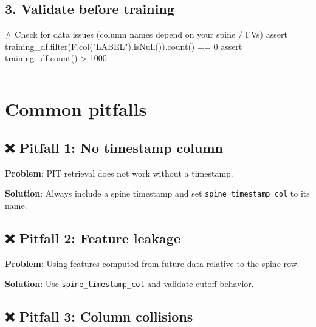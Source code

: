 \documentclass[
  letterpaper,
  DIV=11,
  numbers=noendperiod]{scrreprt}
\newenvironment{Shaded}{\begin{snugshade}}{\end{snugshade}}
\newcommand{\BuiltInTok}[1]{\textcolor[rgb]{0.00,0.23,0.31}{#1}}
\newcommand{\CommentTok}[1]{\textcolor[rgb]{0.37,0.37,0.37}{#1}}
\newcommand{\ControlFlowTok}[1]{\textcolor[rgb]{0.00,0.23,0.31}{#1}}
\newcommand{\DecValTok}[1]{\textcolor[rgb]{0.68,0.00,0.00}{#1}}
\newcommand{\NormalTok}[1]{\textcolor[rgb]{0.00,0.23,0.31}{#1}}
\newcommand{\OperatorTok}[1]{\textcolor[rgb]{0.37,0.37,0.37}{#1}}
\newcommand{\StringTok}[1]{\textcolor[rgb]{0.13,0.47,0.30}{#1}}
\begin{document}
\hypertarget{validate-before-training-1}{%
\subsection{3. Validate before
training}\label{validate-before-training-1}}

\begin{Shaded}
\begin{Highlighting}[]
\CommentTok{\# Check for data issues (column names depend on your spine / FVs)}
\ControlFlowTok{assert}\NormalTok{ training\_df.}\BuiltInTok{filter}\NormalTok{(F.col(}\StringTok{"LABEL"}\NormalTok{).isNull()).count() }\OperatorTok{==} \DecValTok{0}
\ControlFlowTok{assert}\NormalTok{ training\_df.count() }\OperatorTok{\textgreater{}} \DecValTok{1000}
\end{Highlighting}
\end{Shaded}

\begin{center}\rule{0.5\linewidth}{0.5pt}\end{center}

\hypertarget{common-pitfalls-8}{%
\section{Common pitfalls}\label{common-pitfalls-8}}

\hypertarget{pitfall-1-no-timestamp-column}{%
\subsection{❌ Pitfall 1: No timestamp
column}\label{pitfall-1-no-timestamp-column}}

\textbf{Problem}: PIT retrieval does not work without a timestamp.

\textbf{Solution}: Always include a spine timestamp and set
\texttt{spine\_timestamp\_col} to its name.

\hypertarget{pitfall-2-feature-leakage}{%
\subsection{❌ Pitfall 2: Feature
leakage}\label{pitfall-2-feature-leakage}}

\textbf{Problem}: Using features computed from future data relative to
the spine row.

\textbf{Solution}: Use \texttt{spine\_timestamp\_col} and validate
cutoff behavior.

\hypertarget{pitfall-3-column-collisions-1}{%
\subsection{❌ Pitfall 3: Column
collisions}\label{pitfall-3-column-collisions-1}}
\end{document}
